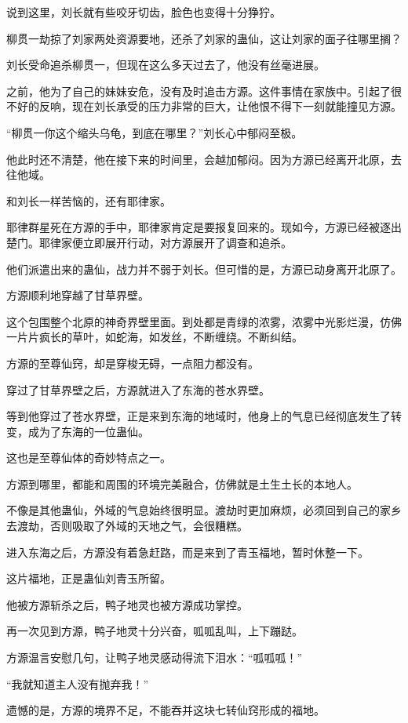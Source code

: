 \begin{this_body}
说到这里，刘长就有些咬牙切齿，脸色也变得十分狰狞。

柳贯一劫掠了刘家两处资源要地，还杀了刘家的蛊仙，这让刘家的面子往哪里搁？

刘长受命追杀柳贯一，但现在这么多天过去了，他没有丝毫进展。

之前，他为了自己的妹妹安危，没有及时追击方源。这件事情在家族中。引起了很不好的反响，现在刘长承受的压力非常的巨大，让他恨不得下一刻就能撞见方源。

“柳贯一你这个缩头乌龟，到底在哪里？”刘长心中郁闷至极。

他此时还不清楚，他在接下来的时间里，会越加郁闷。因为方源已经离开北原，去往他域。

和刘长一样苦恼的，还有耶律家。

耶律群星死在方源的手中，耶律家肯定是要报复回来的。现如今，方源已经被逐出楚门。耶律家便立即展开行动，对方源展开了调查和追杀。

他们派遣出来的蛊仙，战力并不弱于刘长。但可惜的是，方源已动身离开北原了。

方源顺利地穿越了甘草界壁。

这个包围整个北原的神奇界壁里面。到处都是青绿的浓雾，浓雾中光影烂漫，仿佛一片片疯长的草叶，如蛇海，如发丝，不断缠绕。不断纠结。

方源的至尊仙窍，却是穿梭无碍，一点阻力都没有。

穿过了甘草界壁之后，方源就进入了东海的苍水界壁。

等到他穿过了苍水界壁，正是来到东海的地域时，他身上的气息已经彻底发生了转变，成为了东海的一位蛊仙。

这也是至尊仙体的奇妙特点之一。

方源到哪里，都能和周围的环境完美融合，仿佛就是土生土长的本地人。

不像是其他蛊仙，外域的气息始终很明显。渡劫时更加麻烦，必须回到自己的家乡去渡劫，否则吸取了外域的天地之气，会很糟糕。

进入东海之后，方源没有着急赶路，而是来到了青玉福地，暂时休整一下。

这片福地，正是蛊仙刘青玉所留。

他被方源斩杀之后，鸭子地灵也被方源成功掌控。

再一次见到方源，鸭子地灵十分兴奋，呱呱乱叫，上下蹦跶。

方源温言安慰几句，让鸭子地灵感动得流下泪水：“呱呱呱！”

“我就知道主人没有抛弃我！”

遗憾的是，方源的境界不足，不能吞并这块七转仙窍形成的福地。


\end{this_body}
